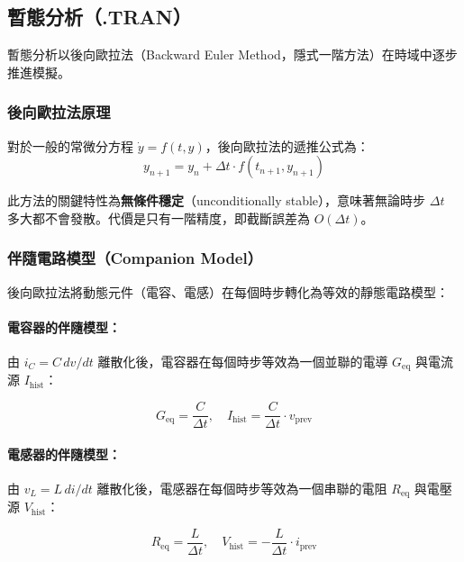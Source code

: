 \documentclass[12pt,a4paper]{article}
\begin{document}
\subsection{暫態分析（.TRAN）}

暫態分析以後向歐拉法（Backward Euler Method，隱式一階方法）在時域中逐步推進模擬。

\subsubsection{後向歐拉法原理}

對於一般的常微分方程 $\dot{y} = f(t, y)$，後向歐拉法的遞推公式為：
\begin{equation}
y_{n+1} = y_n + \Delta t \cdot f(t_{n+1}, y_{n+1})
\end{equation}

此方法的關鍵特性為\textbf{無條件穩定}（unconditionally stable），意味著無論時步 $\Delta t$ 多大都不會發散。代價是只有一階精度，即截斷誤差為 $O(\Delta t)$。

\subsubsection{伴隨電路模型（Companion Model）}

後向歐拉法將動態元件（電容、電感）在每個時步轉化為等效的靜態電路模型：

\paragraph{電容器的伴隨模型：}
由 $i_C = C\,dv/dt$ 離散化後，電容器在每個時步等效為一個並聯的電導 $G_{\text{eq}}$ 與電流源 $I_{\text{hist}}$：

\begin{equation}
\boxed{G_{\text{eq}} = \frac{C}{\Delta t}, \quad I_{\text{hist}} = \frac{C}{\Delta t} \cdot v_{\text{prev}}}
\end{equation}

\paragraph{電感器的伴隨模型：}
由 $v_L = L\,di/dt$ 離散化後，電感器在每個時步等效為一個串聯的電阻 $R_{\text{eq}}$ 與電壓源 $V_{\text{hist}}$：

\begin{equation}
\boxed{R_{\text{eq}} = \frac{L}{\Delta t}, \quad V_{\text{hist}} = -\frac{L}{\Delta t} \cdot i_{\text{prev}}}
\end{equation}
\end{document}
